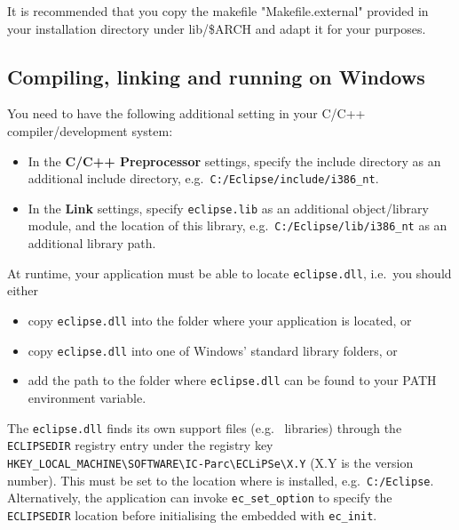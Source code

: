 It is recommended that you copy the makefile "Makefile.external"
provided in your  installation directory under lib/\$ARCH and adapt it
for your purposes.


\subsection{Compiling, linking and running on Windows}

You need to have the following additional setting in your C/C++
compiler/development system:
\begin{itemize}
\item In the {\bf C/C++ Preprocessor} settings,
specify the {\eclipse} include directory as an additional
include directory, e.g.\ \verb+C:/Eclipse/include/i386_nt+.
\item In the {\bf Link} settings,
specify \verb+eclipse.lib+ as an additional object/library
module, and the location of this library, e.g.\
\verb+C:/Eclipse/lib/i386_nt+ as an additional library path.
\end{itemize}

At runtime, your application must be able to locate \verb+eclipse.dll+,
i.e.\ you should either
\begin{itemize}
\item copy \verb+eclipse.dll+ into the folder where your application is located, or
\item copy \verb+eclipse.dll+ into one of Windows' standard library folders, or
\item add the path to the folder where \verb+eclipse.dll+ can be found
	to your PATH environment variable.
\end{itemize}
The \verb+eclipse.dll+ finds its own support files (e.g.\ {\eclipse} libraries)
through the \verb+ECLIPSEDIR+ registry entry under the registry key
\verb+HKEY_LOCAL_MACHINE\SOFTWARE\IC-Parc\ECLiPSe\X.Y+ (X.Y is the version
number).
This must be set to the location where {\eclipse} is installed,
e.g.\ \verb+C:/Eclipse+.
Alternatively, the application can invoke \verb+ec_set_option+ to specify
the \verb+ECLIPSEDIR+ location before initialising the embedded {\eclipse}
with \verb+ec_init+.


